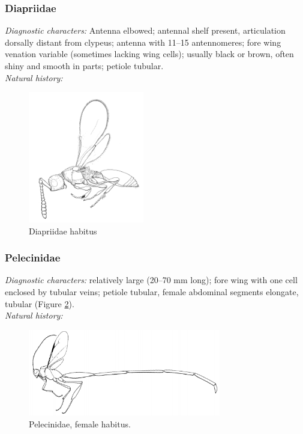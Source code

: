 \documentclass[letterpaper, 11pt]{article}
\begin{document}
\subsubsection{Diapriidae}
\noindent{}\textit{Diagnostic characters:} Antenna elbowed; antennal shelf present, articulation dorsally distant from clypeus; antenna with 11--15 antennomeres; fore wing venation variable (sometimes lacking wing cells); usually black or brown, often shiny and smooth in parts; petiole tubular.\\

\noindent{}\textit{Natural history:} \\

\begin{figure}[ht!]
  \centering
    \includegraphics[width=0.45\textwidth]{DiapriidHabitus}
  \caption{Diapriidae habitus \citep[][Fig. 206]{goulet1993hymenoptera}}
  \label{fig:diapriid1}
\end{figure}

\subsubsection{Pelecinidae}
\noindent{}\textit{Diagnostic characters:} relatively large (20--70 mm long); fore wing with one cell enclosed by tubular veins; petiole tubular, female abdominal segments elongate, tubular (Figure \ref{fig:pelecinid1}).\\

\noindent{}\textit{Natural history:} \\

\begin{figure}[ht!]
  \centering
    \includegraphics[width=0.75\textwidth]{PelecinidHabitus}
  \caption{Pelecinidae, female habitus. \citep[][Fig. 198]{goulet1993hymenoptera}}
  \label{fig:pelecinid1}
\end{figure}
\end{document}
